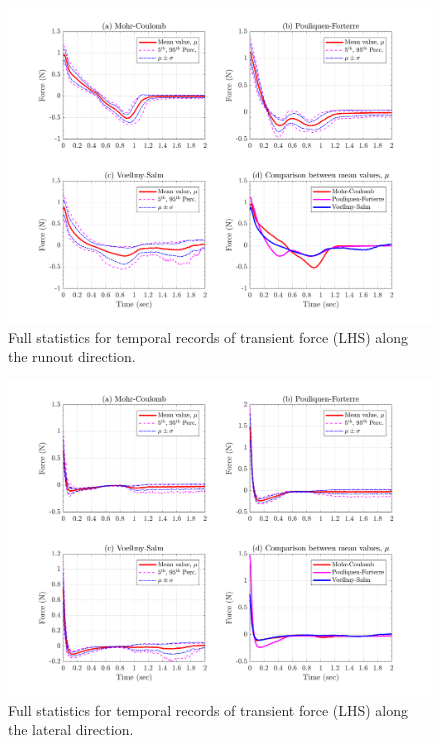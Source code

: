 \documentclass{article}
\begin{document}
\begin{figure}[H]
        \centering
        \includegraphics[width=1\textwidth]{InclinedPlane/GlobalRecords/Ftrnsx.png}
        \caption{Full statistics for temporal records of transient force (LHS) along the runout direction.}
        \label{fig:Ramp-Ftrnsx}
\end{figure}

\begin{figure}[H]
        \centering
        \includegraphics[width=1\textwidth]{InclinedPlane/GlobalRecords/Ftrnsy.png}
        \caption{Full statistics for temporal records of transient force (LHS) along the lateral direction.}
        \label{fig:Ramp-Ftrnsy}
\end{figure}
\end{document}
